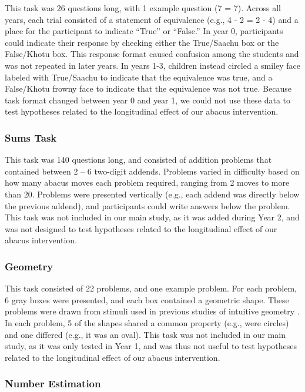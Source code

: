 \documentclass[11pt]{article}
\begin{document}
This task was 26 questions long, with 1 example question (7 = 7). Across all years, each trial consisted of a statement of equivalence (e.g., 4 - 2 = 2 - 4) and a place for the participant to indicate ``True'' or ``False.'' In year 0, participants could indicate their response by checking either the True/Saachu box or the False/Khotu box. This response format caused confusion among the students and was not repeated in later years. In years 1-3, children instead circled a smiley face labeled with True/Saachu to indicate that the equivalence was true, and a False/Khotu frowny face to indicate that the equivalence was not true.  Because task format changed between year 0 and year 1, we could not use these data to test hypotheses related to the longitudinal effect of our abacus intervention.

\subsubsection{Sums Task}

This task was 140 questions long, and consisted of addition problems that contained between 2 -- 6 two-digit addends. Problems varied in difficulty based on how many abacus moves each problem required, ranging from 2 moves to more than 20. Problems were presented vertically (e.g., each addend was directly below the previous addend), and participants could write answers below the problem. This task was not included in our main study, as it was added during Year 2, and was not designed to test hypotheses related to the longitudinal effect of our abacus intervention.

\subsubsection{Geometry}

This task consisted of 22 problems, and one example problem. For each problem, 6 gray boxes were presented, and each box contained a geometric shape. These problems were drawn from stimuli used in previous studies of intuitive geometry \cite{dehaene2006}. In each problem, 5 of the shapes shared a common property (e.g., were circles) and one differed (e.g., it was an oval). This task was not included in our main study, as it was only tested in Year 1, and was thus not useful to test hypotheses related to the longitudinal effect of our abacus intervention.

\subsubsection{Number Estimation}
\end{document}
